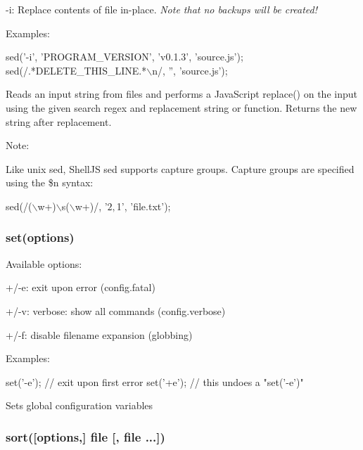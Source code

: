 \begin{DoxyItemize}
\item {\ttfamily -\/i}\+: Replace contents of \textquotesingle{}file\textquotesingle{} in-\/place. {\itshape Note that no backups will be created!}
\end{DoxyItemize}

Examples\+:


\begin{DoxyCode}
sed('-i', 'PROGRAM\_VERSION', 'v0.1.3', 'source.js');
sed(/.*DELETE\_THIS\_LINE.*\(\backslash\)n/, '', 'source.js');
\end{DoxyCode}


Reads an input string from {\ttfamily files} and performs a Java\+Script {\ttfamily replace()} on the input using the given search regex and replacement string or function. Returns the new string after replacement.

Note\+:

Like unix {\ttfamily sed}, Shell\+JS {\ttfamily sed} supports capture groups. Capture groups are specified using the {\ttfamily \$n} syntax\+:


\begin{DoxyCode}
sed(/(\(\backslash\)w+)\(\backslash\)s(\(\backslash\)w+)/, '$2, $1', 'file.txt');
\end{DoxyCode}


\subsubsection*{set(options)}

Available options\+:


\begin{DoxyItemize}
\item {\ttfamily +/-\/e}\+: exit upon error ({\ttfamily config.\+fatal})
\item {\ttfamily +/-\/v}\+: verbose\+: show all commands ({\ttfamily config.\+verbose})
\item {\ttfamily +/-\/f}\+: disable filename expansion (globbing)
\end{DoxyItemize}

Examples\+:


\begin{DoxyCode}
set('-e'); // exit upon first error
set('+e'); // this undoes a "set('-e')"
\end{DoxyCode}


Sets global configuration variables

\subsubsection*{sort(\mbox{[}options,\mbox{]} file \mbox{[}, file ...\mbox{]})}

